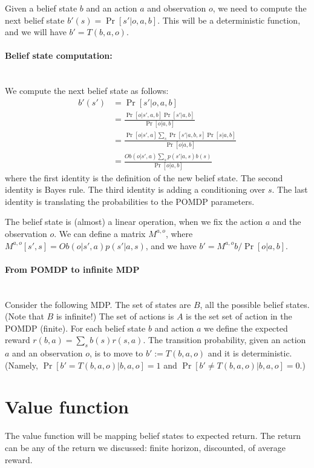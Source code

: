 Given a belief state $b$ and an action $a$ and observation $o$, we
need to compute the next belief state $b'(s)=\Pr[s'|o,a,b]$. This
will be a deterministic function, and we will have $b'=T(b,a,o)$.

\paragraph{Belief state computation:}\ \\
We compute the next belief state as follows:
\begin{align*}
b'(s') &= \Pr[s'|o,a,b]\\
&= \frac{\Pr[o|s',a,b]\Pr[s'|a,b]}{\Pr[o|a,b]}\\
&= \frac{\Pr[o|s',a]\sum_s \Pr[s'|a,b,s]\Pr[s|a,b]}{\Pr[o|a,b]}\\
&= \frac{Ob(o|s',a)\sum_s p(s'|a,s)b(s)}{\Pr[o|a,b]}
\end{align*}
where the first identity is the definition of the new belief state.
The second identity is Bayes rule. The third identity is adding a
conditioning over $s$. The last identity is translating the
probabilities to the POMDP parameters.

The belief state is (almost) a linear operation, when we fix the action $a$ and the observation $o$.
We can define a matrix $M^{a,o}$, where $M^{a,o}[s',s]=Ob(o|s',a) p(s'|a,s)$, and we have $b'=M^{a,o}b/\Pr[o|a,b]$.

\paragraph{From POMDP to infinite MDP}\ \\
Consider the following MDP. The set of states are $B$, all the possible belief states. (Note that $B$ is infinite!) The set of actions is $A$ is the set set of action in the POMDP (finite). For each belief state $b$ and action $a$ we
define the expected reward $r(b,a)=\sum_s b(s)r(s,a)$. The
transition probability, given an action $a$ and an observation $o$,  is to move to $b':=T(b,a,o)$ and it is
deterministic. (Namely, $\Pr[b'=T(b,a,o)|b,a,o]=1$ and $\Pr[b'\neq
T(b,a,o)|b,a,o]=0$.)


\section{Value function}
The value function will be mapping belief states to expected return.
The return can be any of the return we discussed: finite horizon,
discounted, of average reward.

